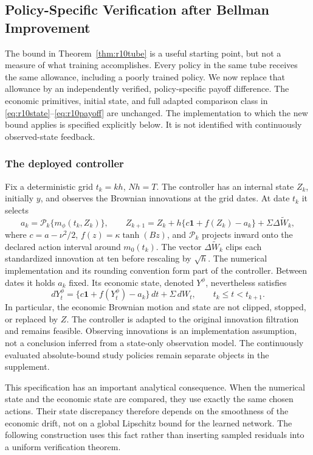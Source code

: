 \subsection{Policy-Specific Verification after Bellman Improvement}\label{sec:r11specific}
The bound in Theorem~\ref{thm:r10tube} is a useful starting point, but not a measure of what training accomplishes. Every policy in the same tube receives the same allowance, including a poorly trained policy. We now replace that allowance by an independently verified, policy-specific payoff difference. The economic primitives, initial state, and full adapted comparison class in \eqref{eq:r10state}--\eqref{eq:r10payoff} are unchanged. The implementation to which the new bound applies is specified explicitly below. It is not identified with continuously observed-state feedback.

\subsubsection{The deployed controller}
Fix a deterministic grid $t_k=kh$, $Nh=T$. The controller has an internal state $Z_k$, initially $y$, and observes the Brownian innovations at the grid dates. At date $t_k$ it selects
\begin{equation}\label{eq:r11implementation}
 a_k=\mathcal P_k\{m_\phi(t_k,Z_k)\},\qquad
 Z_{k+1}=Z_k+h\{c\bm1+f(Z_k)-a_k\}+\Sigma\Delta\widetilde W_k,
\end{equation}
where $c=a-\nu^2/2$, $f(z)=\kappa\tanh(Bz)$, and $\mathcal P_k$ projects inward onto the declared action interval around $m_0(t_k)$. The vector $\Delta\widetilde W_k$ clips each standardized innovation at ten before rescaling by $\sqrt h$. The numerical implementation and its rounding convention form part of the controller. Between dates it holds $a_k$ fixed. Its economic state, denoted $Y^\phi$, nevertheless satisfies
\[
 dY^\phi_t=\{c\bm1+f(Y^\phi_t)-a_k\}\,dt+\Sigma\,dW_t,
 \qquad t_k\leq t<t_{k+1}.
\]
In particular, the economic Brownian motion and state are not clipped, stopped, or replaced by $Z$. The controller is adapted to the original innovation filtration and remains feasible. Observing innovations is an implementation assumption, not a conclusion inferred from a state-only observation model. The continuously evaluated absolute-bound study policies remain separate objects in the supplement.

This specification has an important analytical consequence. When the numerical state and the economic state are compared, they use exactly the same chosen actions. Their state discrepancy therefore depends on the smoothness of the economic drift, not on a global Lipschitz bound for the learned network. The following construction uses this fact rather than inserting sampled residuals into a uniform verification theorem.

